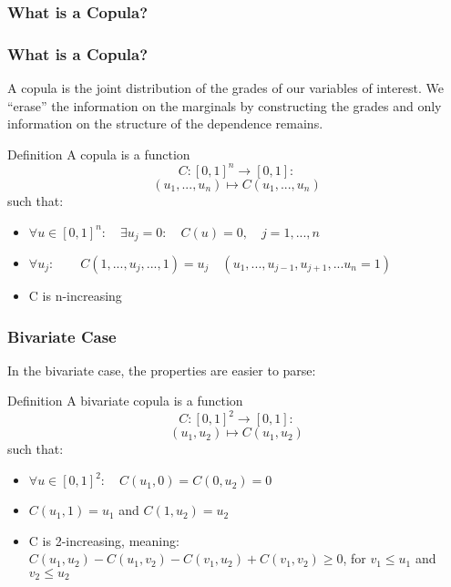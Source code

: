 \documentclass{beamer}
\begin{document}
\begin{frame}
\frametitle{What is a Copula?}
\begin{figure}[htbp]
\label{copsim3}
\end{figure}
\end{frame}

\begin{frame}
\frametitle{What is a Copula?}
A copula is the joint distribution of the grades of our variables of interest. We ``erase'' the information on the marginals by constructing the grades and only information on the structure of the dependence remains.

 \begin{exampleblock}{Definition}
A copula is a function 
\[C: [0, 1] ^n \rightarrow [ 0, 1]: \]
\[(u_1, ..., u_n) \mapsto C(u_1, ..., u_n)\]
such that:
\begin{itemize}
\item{$\forall u \in [0, 1]^n : \quad\exists u_j = 0 :\quad C(u) = 0,\quad j= 1, ..., n$}
\item{$\forall u_j: \qquad C(1, ..., u_j, ..., 1) = u_j \quad(u_1, ..., u_{j-1}, u_{j+1}, ... u_n = 1)$}
\item{C is n-increasing}
\end{itemize}
\end{exampleblock}

\end{frame}

\begin{frame}
\frametitle{Bivariate Case}
In the bivariate case, the properties are easier to parse:

 \begin{exampleblock}{Definition}
A bivariate copula is a function 
\[C: [0, 1] ^2 \rightarrow [ 0, 1]: \]
\[(u_1, u_2) \mapsto C(u_1, u_2)\]
such that:
\begin{itemize}
\item{$\forall u \in [0, 1]^2 :\quad C(u_1, 0) = C(0, u_2) = 0$}
\item{$C(u_1, 1) = u_1$ and $C(1, u_2) = u_2$}
\item{C is 2-increasing, meaning: $C(u_1, u_2)  - C(u_1, v_2) - C(v_1, u_2) + C(v_1, v_2) \geq 0$, for $v_1 \leq u_1$ and $v_2 \leq u_2$}
\end{itemize}
\end{exampleblock}

\end{frame}
\end{document}
